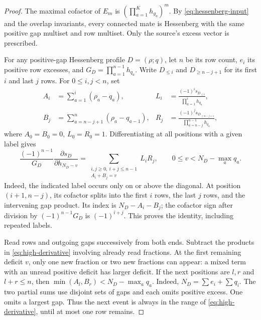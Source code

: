 \documentclass[11pt,a4paper]{amsart}
\numberwithin{equation}{section}
\theoremstyle{plain}
\theoremstyle{definition}
\begin{document}
\begin{proof}
The maximal cofactor of \(E_m\) is
\((\prod_{a=1}^K h_{g_a})^m\).  By \eqref{eq:hessenberg-input}
and the overlap invariants, every connected mate is Hessenberg with the
same positive gap multiset and row multiset.  Only the source's excess
vector is prescribed.

For any positive-gap Hessenberg profile \(D=(\rho;q)\), let
\(n\) be its row count, \(e_i\) its positive row excesses, and
\(G_D=\prod_{a=1}^{n-1}h_{q_a}\).  Write \(D_{\le i}\) and
\(D_{\ge n-j+1}\) for its first \(i\) and last \(j\) rows.
For \(0\le i,j<n\), set
\[
 \begin{aligned}
 A_i&=\sum_{a=1}^{i}(\rho_a-q_a),&
 L_i&=\frac{(-1)^i s_{D_{\le i}}}{\prod_{a=1}^{i}h_{q_a}},\\
 B_j&=\sum_{a=n-j+1}^{n}(\rho_a-q_{a-1}),&
 R_j&=\frac{(-1)^j s_{D_{\ge n-j+1}}}
                         {\prod_{a=n-j}^{n-1}h_{q_a}},
 \end{aligned}
\]
where \(A_0=B_0=0\), \(L_0=R_0=1\).  Differentiating at
all positions with a given label gives
\begin{equation}\label{eq:high-derivative}
 \frac{(-1)^{n-1}}{G_D}\frac{\partial s_D}{\partial h_{N_D-v}}
 =\sum_{\substack{i,j\ge0,\ i+j\le n-1\\ A_i+B_j=v}}L_iR_j,
 \qquad 0\le v<N_D-\max_aq_a.
\end{equation}
Indeed, the indicated label occurs only on or above the diagonal.
At position \((i+1,n-j)\), its cofactor splits into the first
\(i\) rows, the last \(j\) rows, and the intervening gap
product.  Its index is \(N_D-A_i-B_j\); the cofactor sign after
division by \((-1)^{n-1}G_D\) is \((-1)^{i+j}\).
This proves the identity, including repeated labels.

Read rows and outgoing gaps successively from both ends.  Subtract the
products in \eqref{eq:high-derivative} involving already read fractions.
At the first remaining deficit \(v\), only one new fraction or two
new fractions can appear: a mixed term with an unread positive deficit
has larger deficit.  If the next positions are \(l,r\) and
\(l+r\le n\), then \(\min(A_l,B_r)<N_D-\max_aq_a\).
Indeed, \(N_D=\sum e_i+\sum q_i\).
The two partial sums use disjoint sets of gaps and each omits positive
excess.  One omits a largest gap.  Thus the next event is always in the
range of \eqref{eq:high-derivative}, until at most one row remains.


\end{proof}
\end{document}

